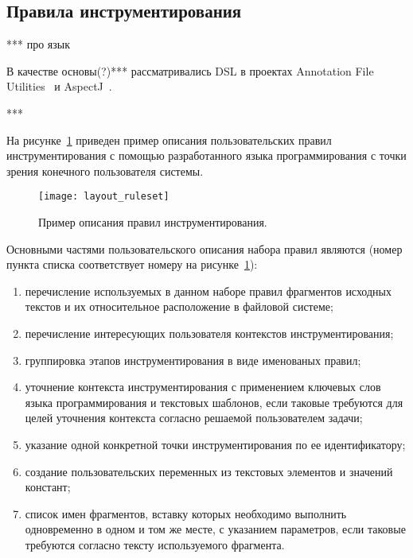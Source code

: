 \subsection{Правила инструментирования}

***
про язык

В качестве основы(?)*** рассматривались DSL в проектах Annotation File Utilities~\cite{jaif} и AspectJ~\cite{aspectj}.

***

На рисунке~\ref{fig:layout-ruleset} приведен пример описания пользовательских правил инструментирования с помощью разработанного языка программирования с точки зрения конечного пользователя системы.

\begin{figure}[!h]
  \centering
  \texttt{[image: layout\_ruleset]}
  \caption{Пример описания правил инструментирования.}
  \label{fig:layout-ruleset}
\end{figure}

Основными частями пользовательского описания набора правил являются (номер пункта списка соответствует номеру на рисунке~\ref{fig:layout-ruleset}):
\begin{enumerate}[noitemsep]
  \item перечисление используемых в данном наборе правил фрагментов исходных текстов и их относительное расположение в файловой системе;
  \item перечисление интересующих пользователя контекстов инструментирования;
  \item группировка этапов инструментирования в виде именованых правил;
  \item уточнение контекста инструментирования с применением ключевых слов языка программирования и текстовых шаблонов, если таковые требуются для целей уточнения контекста согласно решаемой пользователем задачи;
  \item указание одной конкретной точки инструментирования по ее идентификатору;
  \item создание пользовательских переменных из текстовых элементов и значений констант;
  \item список имен фрагментов, вставку которых необходимо выполнить одновременно в одном и том же месте, с указанием параметров, если таковые требуются согласно тексту используемого фрагмента.
\end{enumerate}

